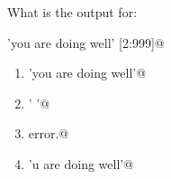\question
What is the output for:

\lstinline@'you are doing well' [2:999]@

\begin{enumerate}
\item \lstinline@'you are doing well'@
\item \lstinline@' '@
\item \lstinline@Index error.@
\item \lstinline@'u are doing well'@
\end{enumerate}

